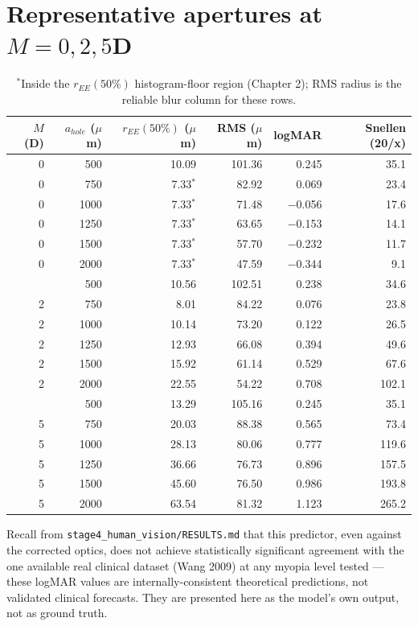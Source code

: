 \documentclass[10.5pt]{report}
\begin{document}
\section{Representative apertures at $M=0,2,5$D}

\begin{table}[htbp]
\centering
\small
\begin{tabular}{rrrrrr}
\toprule
$M$ (D) & $a_{hole}$ ($\mu$m) & $r_{EE}(50\%)$ ($\mu$m) & RMS ($\mu$m) & logMAR & Snellen (20/x) \\
\midrule
0 & 500  & 10.09 & 101.36 & 0.245  & 35.1 \\
0 & 750  & 7.33$^{\ast}$  & 82.92  & 0.069  & 23.4 \\
0 & 1000 & 7.33$^{\ast}$  & 71.48  & $-$0.056 & 17.6 \\
0 & 1250 & 7.33$^{\ast}$  & 63.65  & $-$0.153 & 14.1 \\
0 & 1500 & 7.33$^{\ast}$  & 57.70  & $-$0.232 & 11.7 \\
0 & 2000 & 7.33$^{\ast}$  & 47.59  & $-$0.344 & 9.1 \\
\addlinespace
2 & 500  & 10.56 & 102.51 & 0.238  & 34.6 \\
2 & 750  & 8.01  & 84.22  & 0.076  & 23.8 \\
2 & 1000 & 10.14 & 73.20  & 0.122  & 26.5 \\
2 & 1250 & 12.93 & 66.08  & 0.394  & 49.6 \\
2 & 1500 & 15.92 & 61.14  & 0.529  & 67.6 \\
2 & 2000 & 22.55 & 54.22  & 0.708  & 102.1 \\
\addlinespace
5 & 500  & 13.29 & 105.16 & 0.245  & 35.1 \\
5 & 750  & 20.03 & 88.38  & 0.565  & 73.4 \\
5 & 1000 & 28.13 & 80.06  & 0.777  & 119.6 \\
5 & 1250 & 36.66 & 76.73  & 0.896  & 157.5 \\
5 & 1500 & 45.60 & 76.50  & 0.986  & 193.8 \\
5 & 2000 & 63.54 & 81.32  & 1.123  & 265.2 \\
\bottomrule
\end{tabular}
\caption{$^{\ast}$Inside the $r_{EE}(50\%)$ histogram-floor region (Chapter 2); RMS
radius is the reliable blur column for these rows.}
\end{table}

Recall from \texttt{stage4\_human\_vision/RESULTS.md} that this predictor, even
against the corrected optics, does not achieve statistically significant agreement
with the one available real clinical dataset (Wang 2009) at any myopia level tested
--- these logMAR values are internally-consistent theoretical predictions, not
validated clinical forecasts. They are presented here as the model's own output, not
as ground truth.
\end{document}
